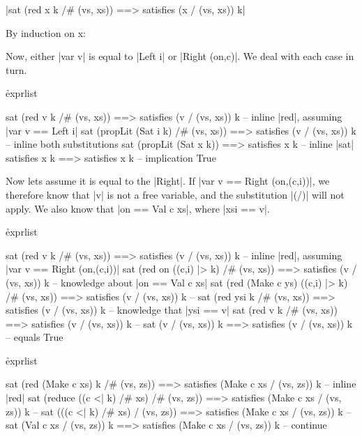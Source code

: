 \ignore{}


{|sat (red x k /# (vs, xs)) ==> satisfies (x / (vs, xs)) k|}

By induction on x:


Now, either |var v| is equal to |Left i| or |Right (on,c)|. We deal with each case in turn.

\h{exprlist}\begin{code}
sat (red v k /# (vs, xs)) ==> satisfies (v / (vs, xs)) k
    -- inline |red|, assuming |var v == Left i|
sat (propLit (Sat i k) /# (vs, xs)) ==> satisfies (v / (vs, xs)) k
    -- inline both substitutions
sat (propLit (Sat x k)) ==> satisfies x k
    -- inline |sat|
satisfies x k ==> satisfies x k
    -- implication
True
\end{code}

Now lets assume it is equal to the |Right|. If |var v == Right (on,(c,i))|, we therefore know that |v| is not a free variable, and the substitution |(/)| will not apply. We also know that |on == Val c xs|, where |xsi == v|.

\h{exprlist}\begin{code}
sat (red v k /# (vs, xs)) ==> satisfies (v / (vs, xs)) k
    -- inline |red|, assuming |var v == Right (on,(c,i))|
sat (red on ((c,i) |> k) /# (vs, xs)) ==> satisfies (v / (vs, xs)) k
    -- knowledge about |on == Val c xs|
sat (red (Make c ys) ((c,i) |> k) /# (vs, xs)) ==> satisfies (v / (vs, xs)) k
    -- \lemma{| ||> |}
sat (red ysi k /# (vs, xs)) ==> satisfies (v / (vs, xs)) k
    -- knowledge that |ysi == v|
sat (red v k /# (vs, xs)) ==> satisfies (v / (vs, xs)) k
    -- 
sat (v / (vs, xs)) k ==> satisfies (v / (vs, xs)) k
    -- equals
True
\end{code}


\h{exprlist}\begin{code}
sat (red (Make c xs) k /# (vs, zs)) ==> satisfies (Make c xs / (vs, zs)) k
    -- inline |red|
sat (reduce ((c <| k) /# xs) /# (vs, zs)) ==> satisfies (Make c xs / (vs, zs)) k
    -- 
sat (((c <| k) /# xs) / (vs, zs)) ==> satisfies (Make c xs / (vs, zs)) k
    -- 
sat (Val c xs / (vs, zs)) k ==> satisfies (Make c xs / (vs, zs)) k
    -- continue
\end{code}

